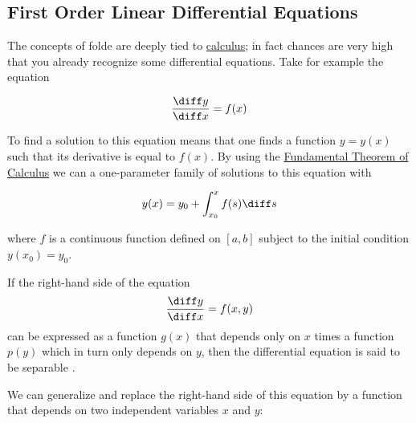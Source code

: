 \subsection{First Order Linear Differential Equations}\label{subsec-folde}

\begin{flushleft}
	The concepts of \gls{folde} are deeply tied to \hyperref[sec-single-var-calc]{calculus};
	in fact chances are very high that you already recognize some differential equations.
	Take for example the equation
\end{flushleft}

\begin{equation}\label{eq-folde-simple}
	\frac{\diff y}{\diff x} = f(x)
\end{equation}

\begin{flushleft}
	To find a solution to this equation means that one finds a function $y=y(x)$ such
	that its derivative is equal to $f(x)$. By using the \hyperref[thm-the-fundamental-theorem-of-calculus]{Fundamental Theorem of Calculus}
	we can a one-parameter family of solutions to this equation with
\end{flushleft}

\begin{equation}\label{eq-folde-general-solution}
	y(x) = y_0 + \int_{x_0}^{x} f(s) \diff s
\end{equation}

\begin{flushleft}
	where $f$ is a continuous function defined on $[a,b]$ subject to the initial
	condition $y(x_0)=y_0$.
\end{flushleft}

\begin{definition}\label{def-separable-equation}
	If the right-hand side of the equation
	\begin{equation}
		\frac{\diff y}{\diff x} = f(x,y)
	\end{equation}
	can be expressed as a function $g(x)$ that depends only on $x$ times a function
	$p(y)$ which in turn only depends on $y$, then the differential equation is
	said to be separable \cite[p.41]{nagle2010}.
\end{definition}

\begin{flushleft}
	We can generalize  and replace the right-hand
	side of this equation by a function that depends on two independent variables
	$x$ and $y$:
\end{flushleft}

